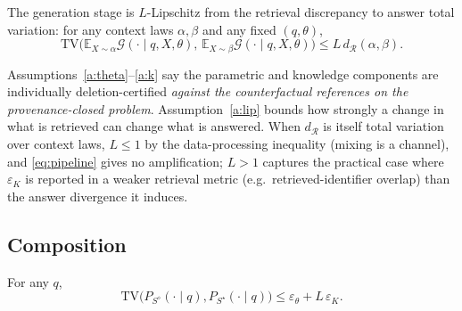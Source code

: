 \begin{assumption}
\label{a:lip}
The generation stage is $L$-Lipschitz from the retrieval discrepancy to
answer total variation: for any context laws $\alpha,\beta$ and any
fixed $(q,\theta)$,
\[
 \mathrm{TV}\!\Big(\mathbb{E}_{X\sim\alpha}\mathcal{G}(\cdot\mid q,X,\theta),\,
 \mathbb{E}_{X\sim\beta}\mathcal{G}(\cdot\mid q,X,\theta)\Big)
 \le L\, d_{\mathcal{R}}(\alpha,\beta).
\]
\end{assumption}

Assumptions~\ref{a:theta}--\ref{a:k} say the parametric and knowledge
components are individually deletion-certified \emph{against the
counterfactual references on the provenance-closed problem}.
Assumption~\ref{a:lip} bounds how strongly a change in what is retrieved
can change what is answered. When $d_{\mathcal{R}}$ is itself total
variation over context laws, $L\le 1$ by the data-processing inequality
(mixing is a channel), and \eqref{eq:pipeline} gives no amplification;
$L>1$ captures the practical case where $\varepsilon_{K}$ is reported in
a weaker retrieval metric (e.g.\ retrieved-identifier overlap) than the
answer divergence it induces.

\subsection{Composition}

\begin{lemma}
\label{lem:hybrid}
For any $q$,
\[
 \mathrm{TV}\!\big(P_{S^{\diamond}}(\cdot\mid q),P_{S^{\star}}(\cdot\mid q)\big)
 \le \varepsilon_{\theta} + L\,\varepsilon_{K}.
\]
\end{lemma}

